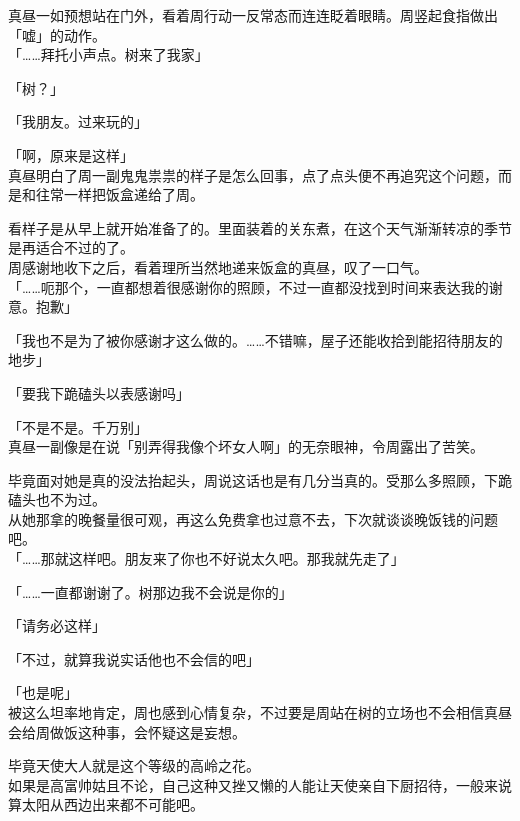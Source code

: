 真昼一如预想站在门外，看着周行动一反常态而连连眨着眼睛。周竖起食指做出「嘘」的动作。\\

「……拜托小声点。树来了我家」

「树？」

「我朋友。过来玩的」

「啊，原来是这样」\\

真昼明白了周一副鬼鬼祟祟的样子是怎么回事，点了点头便不再追究这个问题，而是和往常一样把饭盒递给了周。

看样子是从早上就开始准备了的。里面装着的关东煮，在这个天气渐渐转凉的季节是再适合不过的了。\\

周感谢地收下之后，看着理所当然地递来饭盒的真昼，叹了一口气。\\

「……呃那个，一直都想着很感谢你的照顾，不过一直都没找到时间来表达我的谢意。抱歉」

「我也不是为了被你感谢才这么做的。……不错嘛，屋子还能收拾到能招待朋友的地步」

「要我下跪磕头以表感谢吗」

「不是不是。千万别」\\

真昼一副像是在说「别弄得我像个坏女人啊」的无奈眼神，令周露出了苦笑。

毕竟面对她是真的没法抬起头，周说这话也是有几分当真的。受那么多照顾，下跪磕头也不为过。\\

从她那拿的晚餐量很可观，再这么免费拿也过意不去，下次就谈谈晚饭钱的问题吧。\\

「……那就这样吧。朋友来了你也不好说太久吧。那我就先走了」

「……一直都谢谢了。树那边我不会说是你的」

「请务必这样」

「不过，就算我说实话他也不会信的吧」

「也是呢」\\

被这么坦率地肯定，周也感到心情复杂，不过要是周站在树的立场也不会相信真昼会给周做饭这种事，会怀疑这是妄想。

毕竟天使大人就是这个等级的高岭之花。\\

如果是高富帅姑且不论，自己这种又挫又懒的人能让天使亲自下厨招待，一般来说算太阳从西边出来都不可能吧。\\

